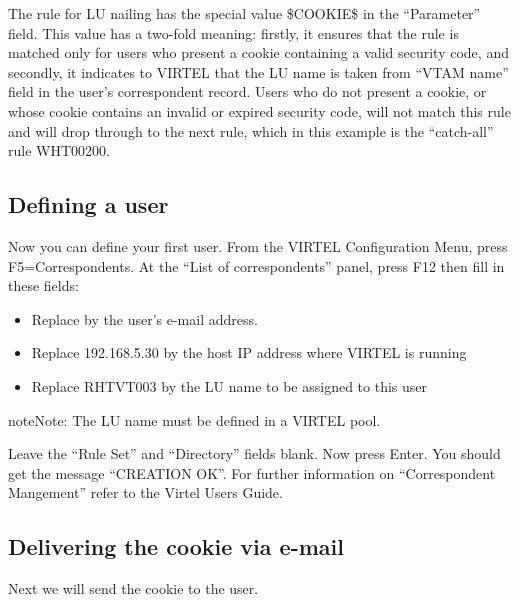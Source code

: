 \documentclass[letterpaper,10pt,english]{sphinxmanual}
\begin{document}

The rule for LU nailing has the special value \$COOKIE\$ in the “Parameter” field.  This value has a two-fold meaning: firstly, it ensures that the rule is matched only for users who present a cookie containing a valid security code, and secondly, it indicates to VIRTEL that the LU name is taken from “VTAM name” field in the user’s correspondent record.
Users who do not present a cookie, or whose cookie contains an invalid or expired security code, will not match this rule and will drop through to the next rule, which in this example is the “catch-all” rule WHT00200.


\subsection{Defining a user}
\label{\detokenize{connectivity_guide:defining-a-user}}
Now you can define your first user.  From the VIRTEL Configuration Menu, press F5=Correspondents.  At the “List of correspondents” panel, press F12 then fill in these fields:


\begin{itemize}
\item {} 
Replace  by the user’s e-mail address.

\item {} 
Replace 192.168.5.30 by the host IP address where VIRTEL is running

\item {} 
Replace RHTVT003 by the LU name to be assigned to this user

\end{itemize}

\begin{sphinxadmonition}{note}{Note:}
The LU name must be defined in a VIRTEL pool.
\end{sphinxadmonition}

Leave the “Rule Set” and “Directory” fields blank. Now press Enter. You should get the message “CREATION OK”. For further information on “Correspondent Mangement” refer to the Virtel Users Guide.


\subsection{Delivering the cookie via e-mail}
\label{\detokenize{connectivity_guide:delivering-the-cookie-via-e-mail}}
Next we will send the cookie to the user.
\end{document}
